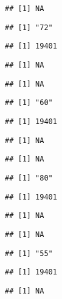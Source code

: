 \documentclass[
]{article}
\begin{document}
\begin{verbatim}
## [1] NA
\end{verbatim}

\begin{verbatim}
## [1] "72"
\end{verbatim}

\begin{verbatim}
## [1] 19401
\end{verbatim}

\begin{verbatim}
## [1] NA
\end{verbatim}

\begin{verbatim}
## [1] NA
\end{verbatim}

\begin{verbatim}
## [1] "60"
\end{verbatim}

\begin{verbatim}
## [1] 19401
\end{verbatim}

\begin{verbatim}
## [1] NA
\end{verbatim}

\begin{verbatim}
## [1] NA
\end{verbatim}

\begin{verbatim}
## [1] "80"
\end{verbatim}

\begin{verbatim}
## [1] 19401
\end{verbatim}

\begin{verbatim}
## [1] NA
\end{verbatim}

\begin{verbatim}
## [1] NA
\end{verbatim}

\begin{verbatim}
## [1] "55"
\end{verbatim}

\begin{verbatim}
## [1] 19401
\end{verbatim}

\begin{verbatim}
## [1] NA
\end{verbatim}
\end{document}

